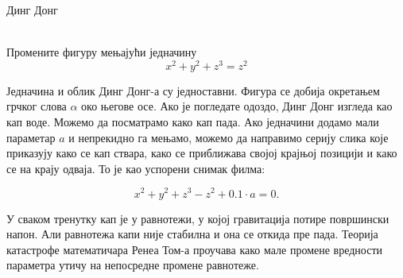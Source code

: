 \documentclass[sr]{./../../common/SurferDesc}%
\begin{document}
\footnotesize

\begin{surferPage}
  \begin{surferTitle}Динг Донг\end{surferTitle}  \\
Промените фигуру мењајући једначину\\

\smallskip
\[x^2	+ y^2	+ z^3	= z^2\]

\singlespacing
Једначина и облик Динг Донг-а су једноставни. Фигура се добија окретањем грчког слова $\alpha$ око његове осе. Ако је погледате одоздо, Динг Донг изгледа као кап воде. Можемо да посматрамо како кап пада.
\newline
Ако једначини додамо мали параметар $a$ и непрекидно га мењамо, можемо да направимо серију слика које приказују како се кап ствара, како се приближава својој крајњој позицији и како се на крају одваја. То је као успорени снимак филма:

\[x^2	+ y^2	+ z^3	-z^2+0.1\cdot a=0.\]

У сваком тренутку кап је у равнотежи, у којој гравитација потире површински напон. Али равнотежа капи није стабилна и она се откида пре пада. Теорија катастрофе математичара Ренеа Том-а проучава како мале промене вредности параметра утичу на непосредне промене равнотеже. 



  \begin{surferText}
     \end{surferText}
\end{surferPage}


\end{document}
